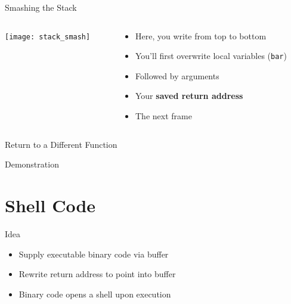 \documentclass[beamer]{uibk}
\begin{document}
\begin{frame}{Smashing the Stack}
    \begin{columns}
        \begin{column}{0.5\textwidth}
            \begin{center}
                \texttt{[image: stack\_smash]}
            \end{center}
        \end{column}
        \begin{column}{0.5\textwidth}
            \begin{itemize}
                \item Here, you write from top to bottom \bigskip
                \item You'll first overwrite local variables (\texttt{bar}) \bigskip
                \item Followed by arguments \bigskip
                \item Your \textbf{saved return address} \bigskip
                \item The next frame
            \end{itemize}
        \end{column}
    \end{columns}
\end{frame}

\begin{frame}{Return to a Different Function}
    \begin{center}
        \huge Demonstration
    \end{center}
\end{frame}

\section{Shell Code}

\begin{frame}{Idea}
    \begin{itemize}
        \item Supply executable binary code via buffer
        \medskip
        \item Rewrite return address to point into buffer
        \medskip
        \item Binary code opens a shell upon execution
    \end{itemize}
\end{frame}
\end{document}
